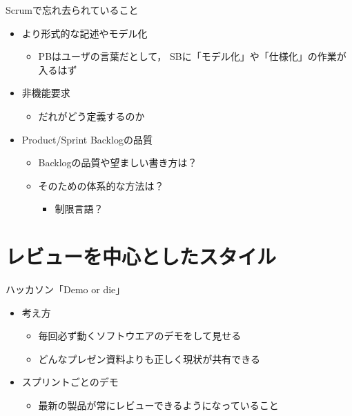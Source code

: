 \documentclass[t]{beamer}
\begin{document}
\begin{frame}[label=sec-3-2]{Scrumで忘れ去られていること}
\begin{itemize}
\item より形式的な記述やモデル化
\begin{itemize}
\item PBはユーザの言葉だとして，
SBに「モデル化」や「仕様化」の作業が入るはず
\end{itemize}
\item 非機能要求
\begin{itemize}
\item だれがどう定義するのか
\end{itemize}
\item Product/Sprint Backlogの品質
\begin{itemize}
\item Backlogの品質や望ましい書き方は？
\item そのための体系的な方法は？
\begin{itemize}
\item 制限言語？
\end{itemize}
\end{itemize}
\end{itemize}
\end{frame}

\section{レビューを中心としたスタイル}
\label{sec-4}
\begin{frame}[label=sec-4-1]{ハッカソン「Demo or die」}
\begin{itemize}
\item 考え方
\begin{itemize}
\item 毎回必ず動くソフトウエアのデモをして見せる
\item どんなプレゼン資料よりも正しく現状が共有できる
\end{itemize}
\item スプリントごとのデモ
\begin{itemize}
\item 最新の製品が常にレビューできるようになっていること
\end{itemize}
\end{itemize}
\end{frame}
\end{document}
